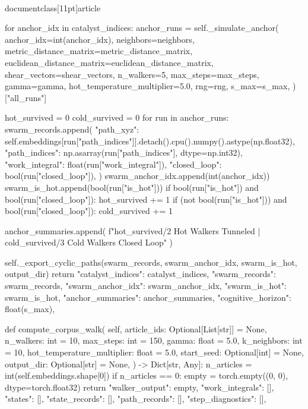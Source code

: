 \\documentclass[11pt]{article}
\begin{document}
\begin{CodeBlock}
        for anchor_idx in catalyst_indices:
            anchor_runs = self._simulate_anchor(
                anchor_idx=int(anchor_idx),
                neighbors=neighbors,
                metric_distance_matrix=metric_distance_matrix,
                euclidean_distance_matrix=euclidean_distance_matrix,
                shear_vectors=shear_vectors,
                n_walkers=5,
                max_steps=max_steps,
                gamma=gamma,
                hot_temperature_multiplier=5.0,
                rng=rng,
                s_max=s_max,
            )["all_runs"]

            hot_survived = 0
            cold_survived = 0
            for run in anchor_runs:
                swarm_records.append(
                    {
                        "path_xyz": self.embeddings[run["path_indices"]].detach().cpu().numpy().astype(np.float32),
                        "path_indices": np.asarray(run["path_indices"], dtype=np.int32),
                        "work_integral": float(run["work_integral"]),
                        "closed_loop": bool(run["closed_loop"]),
                    }
                )
                swarm_anchor_idx.append(int(anchor_idx))
                swarm_is_hot.append(bool(run["is_hot"]))
                if bool(run["is_hot"]) and bool(run["closed_loop"]):
                    hot_survived += 1
                if (not bool(run["is_hot"])) and bool(run["closed_loop"]):
                    cold_survived += 1

            anchor_summaries.append(
                f"{hot_survived}/2 Hot Walkers Tunneled | {cold_survived}/3 Cold Walkers Closed Loop"
            )

        self._export_cyclic_paths(swarm_records, swarm_anchor_idx, swarm_is_hot, output_dir)
        return {
            "catalyst_indices": catalyst_indices,
            "swarm_records": swarm_records,
            "swarm_anchor_idx": swarm_anchor_idx,
            "swarm_is_hot": swarm_is_hot,
            "anchor_summaries": anchor_summaries,
            "cognitive_horizon": float(s_max),
        }

    def compute_corpus_walk(
        self,
        article_ids: Optional[List[str]] = None,
        n_walkers: int = 10,
        max_steps: int = 150,
        gamma: float = 5.0,
        k_neighbors: int = 10,
        hot_temperature_multiplier: float = 5.0,
        start_seed: Optional[int] = None,
        output_dir: Optional[str] = None,
    ) -> Dict[str, Any]:
        n_articles = int(self.embeddings.shape[0])
        if n_articles == 0:
            empty = torch.empty((0, 0), dtype=torch.float32)
            return {
                "walker_output": empty,
                "work_integrals": [],
                "states": [],
                "state_records": [],
                "path_records": [],
                "step_diagnostics": [],
            }


\end{CodeBlock}
\end{document}
